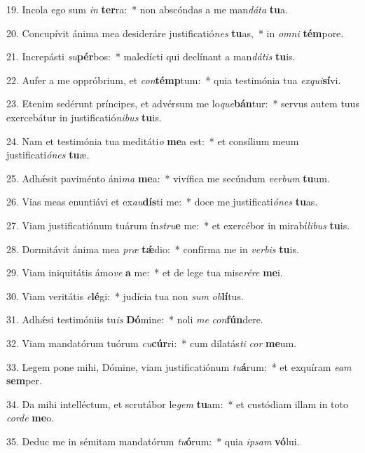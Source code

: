 19. Incola ego sum \textit{in} \textbf{ter}ra:~*  non abscóndas a me man\textit{dá}\textit{ta} \textbf{tu}a.\

20. Concupívit ánima mea desideráre justificatió\textit{nes} \textbf{tu}as,~*  in \textit{om}\textit{ni} \textbf{tém}pore.\

21. Increpásti \textit{su}\textbf{pér}bos:~*  maledícti qui declínant a man\textit{dá}\textit{tis} \textbf{tu}is.\

22. Aufer a me oppróbrium, et \textit{con}\textbf{témp}tum:~*  quia testimónia tua \textit{ex}\textit{qui}\textbf{sí}vi.\

23. Etenim sedérunt príncipes, et advérsum me lo\textit{que}\textbf{bán}tur:~*  servus autem tuus exercebátur in justificatió\textit{ni}\textit{bus} \textbf{tu}is.\

24. Nam et testimónia tua meditáti\textit{o} \textbf{me}a est:~*  et consílium meum justificati\textit{ó}\textit{nes} \textbf{tu}æ.\

25. Adhǽsit paviménto áni\textit{ma} \textbf{me}a:~*  vivífica me secúndum \textit{ver}\textit{bum} \textbf{tu}um.\

26. Vias meas enuntiávi et ex\textit{au}\textbf{dís}ti me:~*  doce me justificati\textit{ó}\textit{nes} \textbf{tu}as.\

27. Viam justificatiónum tuárum ín\textit{stru}\textbf{e} me:~*  et exercébor in mirabí\textit{li}\textit{bus} \textbf{tu}is.\

28. Dormitávit ánima mea \textit{præ} \textbf{tǽ}dio:~*  confírma me in \textit{ver}\textit{bis} \textbf{tu}is.\

29. Viam iniquitátis ámo\textit{ve} \textbf{a} me:~*  et de lege tua mise\textit{ré}\textit{re} \textbf{me}i.\

30. Viam veritátis \textit{e}\textbf{lé}gi:~*  judícia tua non \textit{sum} \textit{ob}\textbf{lí}tus.\

31. Adhǽsi testimóniis tu\textit{is} \textbf{Dó}mine:~*  noli \textit{me} \textit{con}\textbf{fún}dere.\

32. Viam mandatórum tuórum \textit{cu}\textbf{cúr}ri:~*  cum dilatás\textit{ti} \textit{cor} \textbf{me}um.\

33. Legem pone mihi, Dómine, viam justificatiónum \textit{tu}\textbf{á}rum:~*  et exquíram \textit{e}\textit{am} \textbf{sem}per.\

34. Da mihi intelléctum, et scrutábor le\textit{gem} \textbf{tu}am:~*  et custódiam illam in toto \textit{cor}\textit{de} \textbf{me}o.\

35. Deduc me in sémitam mandatórum \textit{tu}\textbf{ó}rum:~*  quia \textit{ip}\textit{sam} \textbf{vó}lui.\

